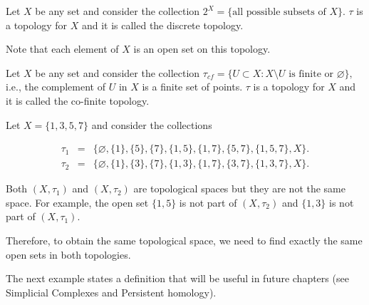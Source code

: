\documentclass[
	fontsize=10pt, %
	twoside=false, %
	secnumdepth=1, %
]{kaobook}
\begin{document}
\begin{example}
Let $X$ be any set and consider the collection $2^X=\{\mbox{all possible subsets of } X\}.$ $\tau$ is a topology for $X$ and it is called the discrete topology. 

Note that each element of $X$ is an open set on this topology. 
\end{example}

\begin{example}
Let $X$ be any set and consider the collection $\tau_{cf}=\{U\subset X: X\setminus U \mbox{ is finite or }\varnothing\},$ i.e., the complement of $U$ in $X$ is a finite set of points. $\tau$ is a topology for $X$ and it is called the co-finite topology. 
\end{example}


\begin{example}
Let $X=\{1,3,5,7\}$ and consider the collections

\begin{eqnarray*}
\tau_1 &=& \{\varnothing, \{1\},\{5\},\{7\},\{1,5\},\{1,7\},\{5,7\},\{1,5,7\},X\}. \\
\tau_2 &=& \{\varnothing, \{1\},\{3\},\{7\},\{1,3\},\{1,7\},\{3,7\},\{1,3,7\},X\}.
\end{eqnarray*}

Both $(X,\tau_1)$ and $(X,\tau_2)$ are topological spaces but they are not the same space. For example, the open set $\{1,5\}$ is not part of $(X,\tau_2)$ and $\{1,3\}$ is not part of $(X,\tau_1).$ 

Therefore, to obtain the same topological space, we need to find exactly the same open sets in both topologies.
\end{example}

The next example states a definition that will be useful in future chapters (see Simplicial Complexes and Persistent homology). 
\end{document}
